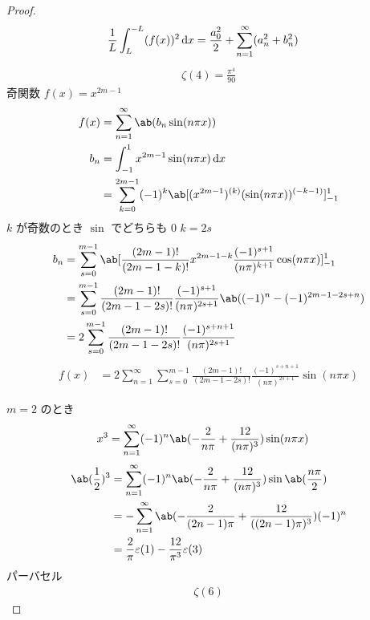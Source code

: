 \documentclass[uplatex,dvipdfmx,a4paper,11pt]{jlreq}
\begin{document}
\begin{proof}
\begin{align}
    \frac{1}{L}\int_{L}^{-L}(f(x))^2\dl{x} & = \frac{a_0^2}{2} + \sum_{n=1}^{\infty}(a_n^2 + b_n^2)
  \end{align}
  \begin{align}
    \zeta(4) = \frac{\pi^4}{90}
  \end{align}
  奇関数 $f(x) = x^{2m - 1}$
  \begin{align}
    f(x) & = \sum_{n=1}^{\infty}\ab(b_n\sin(n\pi x))                                          \\
    b_n  & = \int_{-1}^{1}x^{2m - 1}\sin(n\pi x)\dl{x}                                        \\
         & = \sum_{k=0}^{2m - 1}(-1)^k\ab[(x^{2m - 1})^{(k)}(\sin(n\pi x))^{(-k-1)}]_{-1}^{1}
  \end{align}
  $k$ が奇数のとき $\sin$ でどちらも $0$
  $k = 2s$
  \begin{align}
    b_n & = \sum_{s=0}^{m - 1}\ab[\frac{(2m - 1)!}{(2m - 1 - k)!}x^{2m - 1 - k}\frac{(-1)^{s+1}}{(n\pi)^{k + 1}}\cos(n\pi x)]_{-1}^{1} \\
        & = \sum_{s=0}^{m - 1}\frac{(2m - 1)!}{(2m - 1 - 2s)!}\frac{(-1)^{s+1}}{(n\pi)^{2s + 1}}\ab((-1)^n - (-1)^{2m - 1 - 2s + n})   \\
        & = 2\sum_{s=0}^{m - 1}\frac{(2m - 1)!}{(2m - 1 - 2s)!}\frac{(-1)^{s+n+1}}{(n\pi)^{2s + 1}}
  \end{align}
  \begin{align}
    f(x) & = 2\sum_{n=1}^{\infty}\sum_{s=0}^{m - 1}\frac{(2m - 1)!}{(2m - 1 - 2s)!}\frac{(-1)^{s+n+1}}{(n\pi)^{2s + 1}}\sin(n\pi x)
  \end{align}

  $m = 2$ のとき
  \begin{align}
    x^3 & = \sum_{n=1}^{\infty}(-1)^{n}\ab(-\frac{2}{n\pi} + \frac{12}{(n\pi)^{3}})\sin(n\pi x)
  \end{align}
  \begin{align}
    \ab(\frac{1}{2})^3 & = \sum_{n=1}^{\infty}(-1)^{n}\ab(-\frac{2}{n\pi} + \frac{12}{(n\pi)^{3}})\sin\ab(\frac{n\pi}{2}) \\
                       & = -\sum_{n=1}^{\infty}\ab(-\frac{2}{(2n - 1)\pi} + \frac{12}{((2n - 1)\pi)^{3}})(-1)^n           \\
                       & = \frac{2}{\pi}\varepsilon(1) - \frac{12}{\pi^{3}}\varepsilon(3)                                 \\
  \end{align}
  パーバセル
  \begin{align}
    \zeta(6)
  \end{align}

\end{proof}
\end{document}
